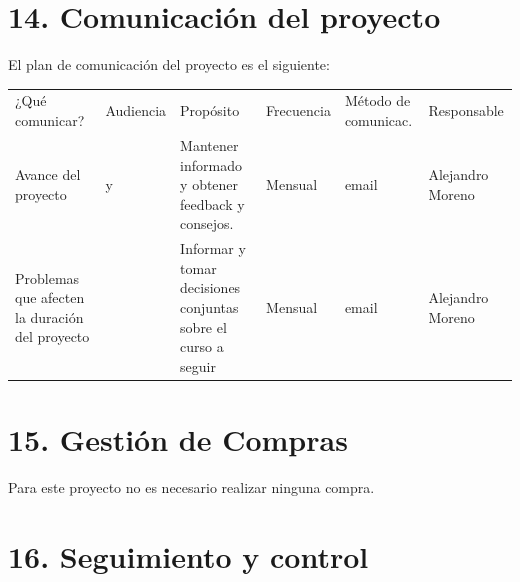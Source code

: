 \documentclass[11pt]{charter}
\begin{document}
\begin{itemize}
\end{itemize}


\section{14. Comunicación del proyecto}
\label{sec:comunicaciones}

El plan de comunicación del proyecto es el siguiente:

\begin{table}[H]
\centering
\begin{tabularx}{\linewidth}{@{}|X|C{2.5cm}|C{3cm}|C{1.8cm}|C{2cm}|C{2.2cm}|@{}}
\hline
{} 
           \\ \hline
{} 
¿Qué comunicar? 									& Audiencia 				& Propósito & Frecuencia & Método de comunicac. & Responsable \\ \hline
Avance del proyecto         						& \supname y \clientename  & Mantener informado y obtener feedback y consejos. 				&  Mensual 	& email & Alejandro Moreno  \\ \hline
Problemas que afecten la duración del proyecto    &  \clientename		        & Informar y tomar decisiones conjuntas sobre el curso a seguir 	& Mensual 	& email & Alejandro Moreno   \\ \hline
\end{tabularx}%
\end{table}

\section{15. Gestión de Compras}
\label{sec:compras}

Para este proyecto no es necesario realizar ninguna compra.

\section{16. Seguimiento y control}
\label{sec:seguimiento}
\end{document}
